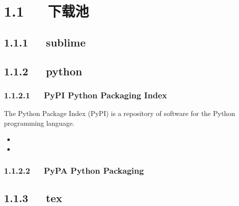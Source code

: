 \documentclass[letterpaper,12pt,english]{sphinxmanual}
\begin{document}
\section{1.1   下载池}
\label{\detokenize{001software/001install/001._u7f51_u7ad9/_u7f51_u7ad9_u8d44_u6e90_u7ad9_u70b9:id3}}

\subsection{1.1.1   sublime}
\label{\detokenize{001software/001install/001._u7f51_u7ad9/_u7f51_u7ad9_u8d44_u6e90_u7ad9_u70b9:sublime}}


\subsection{1.1.2   python}
\label{\detokenize{001software/001install/001._u7f51_u7ad9/_u7f51_u7ad9_u8d44_u6e90_u7ad9_u70b9:python}}

\subsubsection{1.1.2.1   PyPI \sphinxhyphen{} Python Packaging Index}
\label{\detokenize{001software/001install/001._u7f51_u7ad9/_u7f51_u7ad9_u8d44_u6e90_u7ad9_u70b9:pypi-python-packaging-index}}
The Python Package Index (PyPI) is a repository of software for the
Python programming language.
\begin{itemize}
\item {} 

\item {} 

\end{itemize}


\subsubsection{1.1.2.2   PyPA Python Packaging}
\label{\detokenize{001software/001install/001._u7f51_u7ad9/_u7f51_u7ad9_u8d44_u6e90_u7ad9_u70b9:pypa-python-packaging}}

\subsection{1.1.3   tex}
\label{\detokenize{001software/001install/001._u7f51_u7ad9/_u7f51_u7ad9_u8d44_u6e90_u7ad9_u70b9:tex}}
\end{document}
